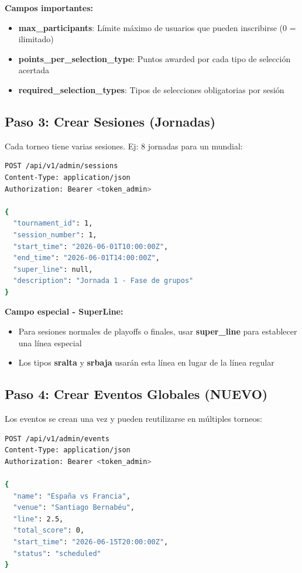 \documentclass[12pt,a4paper]{article}
\begin{document}
\textbf{Campos importantes:}
\begin{itemize}
    \item \textbf{max\_participants}: Límite máximo de usuarios que pueden inscribirse (0 = ilimitado)
    \item \textbf{points\_per\_selection\_type}: Puntos awarded por cada tipo de selección acertada
    \item \textbf{required\_selection\_types}: Tipos de selecciones obligatorias por sesión
\end{itemize}

\subsection{Paso 3: Crear Sesiones (Jornadas)}
Cada torneo tiene varias sesiones. Ej: 8 jornadas para un mundial:

\begin{lstlisting}[language=bash]
POST /api/v1/admin/sessions
Content-Type: application/json
Authorization: Bearer <token_admin>

{
  "tournament_id": 1,
  "session_number": 1,
  "start_time": "2026-06-01T10:00:00Z",
  "end_time": "2026-06-01T14:00:00Z",
  "super_line": null,
  "description": "Jornada 1 - Fase de grupos"
}
\end{lstlisting}

\textbf{Campo especial - SuperLine:}
\begin{itemize}
    \item Para sesiones normales de playoffs o finales, usar \textbf{super\_line} para establecer una línea especial
    \item Los tipos \textbf{sralta} y \textbf{srbaja} usarán esta línea en lugar de la línea regular
\end{itemize}

\subsection{Paso 4: Crear Eventos Globales (NUEVO)}
Los eventos se crean una vez y pueden reutilizarse en múltiples torneos:

\begin{lstlisting}[language=bash]
POST /api/v1/admin/events
Content-Type: application/json
Authorization: Bearer <token_admin>

{
  "name": "España vs Francia",
  "venue": "Santiago Bernabéu",
  "line": 2.5,
  "total_score": 0,
  "start_time": "2026-06-15T20:00:00Z",
  "status": "scheduled"
}
\end{lstlisting}
\end{document}
